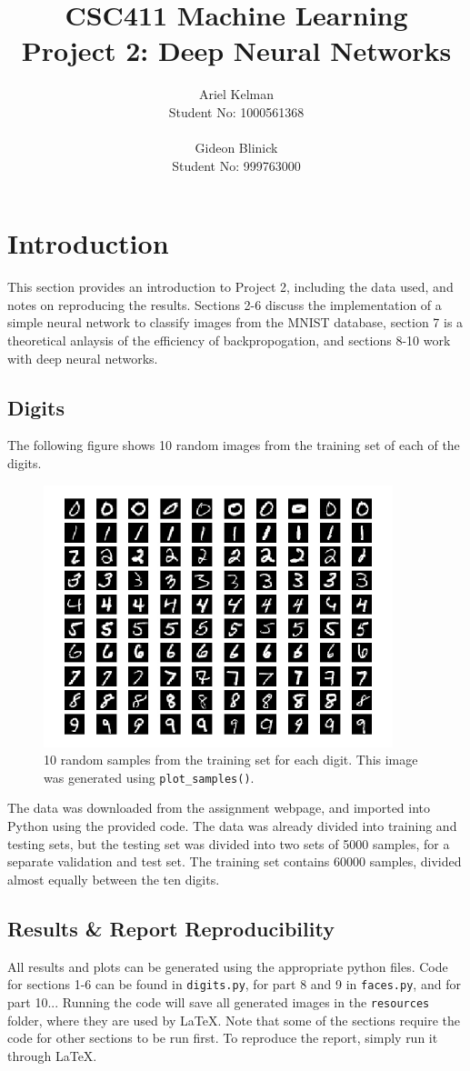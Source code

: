 \documentclass{article}
\title{CSC411 Machine Learning \\ Project 2: Deep Neural Networks}
\author{ Ariel Kelman \\ Student No: 1000561368
         \\ \\
         Gideon Blinick \\ Student No: 999763000 }
\begin{document}
   \maketitle{}


   \section{Introduction}
   This section provides an introduction to Project 2, including the data used, and notes
   on reproducing the results. Sections 2-6 discuss the implementation of a simple neural
   network to classify images from the MNIST database, section 7 is a theoretical anlaysis
   of the efficiency of backpropogation, and sections 8-10 work with deep neural networks.

   \subsection{Digits}
   The following figure shows 10 random images from the training set of each of the digits.
   \begin{figure}[H] \centering
      \includegraphics[width=4in]{resources/part1}
      \caption{10 random samples from the training set for each digit. This image
         was generated using \texttt{plot\_samples()}. }
   \end{figure}
   The data was downloaded from the assignment webpage, and imported into Python using the
   provided code. The data was already divided into training and testing sets, but the testing
   set was divided into two sets of 5000 samples, for a separate validation and test set.
   The training set contains 60000 samples, divided almost equally between the ten digits.

   \subsection{Results \& Report Reproducibility}
   All results and plots can be generated using the appropriate python files.
   Code for sections 1-6 can be found in \texttt{digits.py}, for part 8 and 9 in \texttt{faces.py},
   and for part 10...
   Running the code will save all generated images in the \texttt{resources} folder,
   where they are used by \LaTeX. Note that some of the sections require the code for
   other sections to be run first.
   To reproduce the report, simply run it through \LaTeX.
\end{document}
